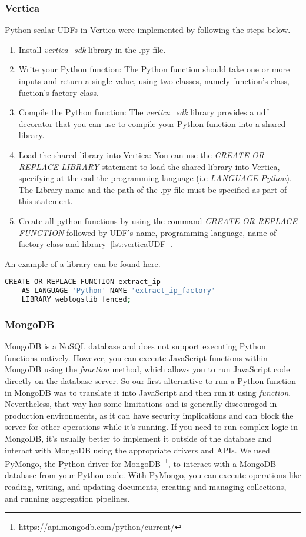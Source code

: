 \subsubsection{Vertica}
Python scalar UDFs in Vertica were implemented by following the steps below. 
\begin{enumerate}
	\item Install \emph{vertica\_sdk} library in the .py file.
	\item Write your Python function: The Python function should take 
	one or more inputs and return a single value, using two classes, namely
	function's class, fuction's factory class.
	\item Compile the Python function: The \emph{vertica\_sdk} library provides 
	a udf decorator that you can use to compile your Python function into a shared library.
	\item Load the shared library into Vertica: You can use the 
	\emph{CREATE OR REPLACE LIBRARY} statement to load the shared library into Vertica, 
	specifying at the end the programming language (i.e \emph{LANGUAGE Python}).
	The Library name and the path of the .py file must be specified as part of this statement.
	\item Create all python functions by using the command \emph{CREATE OR REPLACE FUNCTION}
	followed by UDF's name, programming language, name of factory class and library~\ref{lst:verticaUDF} .
\end{enumerate}
An example of a library can be found \href{https://www.vertica.com/docs/9.2.x/HTML/Content/Authoring/ExtendingVertica/UDx/ScalarFunctions/Python/PythonExampleAdd2Ints.htm}{here}.
\begin{lstlisting}[language=sh, caption={Example of UDF in Vertica},label={lst:verticaUDF}] 
	CREATE OR REPLACE FUNCTION extract_ip 
	AS LANGUAGE 'Python' NAME 'extract_ip_factory' 
	LIBRARY weblogslib fenced;
\end{lstlisting}

\subsubsection{MongoDB}
MongoDB is a NoSQL database and does not support executing Python functions
natively. 
However, you can execute JavaScript functions within MongoDB using the 
\emph {function} 
method, which allows you to run JavaScript code directly on the database server.
So our first alternative to run a Python function in MongoDB was to
translate it into JavaScript and then run it using \emph{function}. 
Nevertheless, that way has some limitations and is generally discouraged in production environments, 
as it can have security implications and can block the server for other operations while it's running. 
If you need to run complex logic in MongoDB, 
it's usually better to implement it outside of the database and interact with MongoDB 
using the appropriate drivers and APIs.
We used PyMongo, the Python driver for MongoDB~\footnote{\url{https://api.mongodb.com/python/current/}},
to interact with a MongoDB database from your Python code. 
With PyMongo, you can execute operations like reading, writing, and updating documents, 
creating and managing collections, and running aggregation pipelines.


